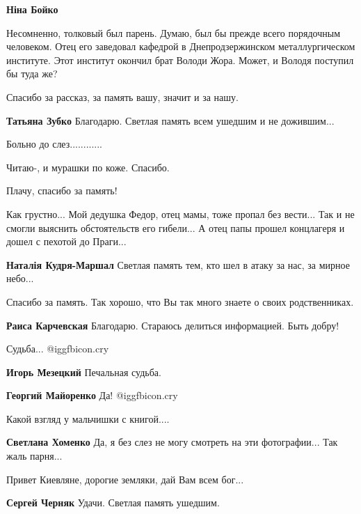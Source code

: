 \begin{itemize}
\begin{itemize}
\textbf{Ніна Бойко} 

Несомненно, толковый был парень. Думаю, был бы прежде всего порядочным
человеком. Отец его заведовал кафедрой в Днепродзержинском металлургическом
институте. Этот институт окончил брат Володи Жора. Может, и Володя поступил бы
туда же?

\end{itemize} %

Спасибо за рассказ, за память вашу, значит и за нашу.

\textbf{Татьяна Зубко} Благодарю. Светлая память всем ушедшим и не дожившим...

Больно до слез............

Читаю-, и мурашки по коже. Спасибо.

Плачу, спасибо за память!


Как грустно... Мой дедушка Федор, отец мамы, тоже пропал без вести... Так и не
смогли выяснить обстоятельств его гибели... А отец папы прошел концлагеря и
дошел с пехотой до Праги...

\textbf{Наталія Кудря-Маршал} Светлая память тем, кто шел в атаку за нас, за мирное небо...

Спасибо за память. Так хорошо, что Вы так много знаете о своих родственниках.

\textbf{Раиса Карчевская} Благодарю. Стараюсь делиться информацией. Быть добру!

Судьба... @igg{fbicon.cry} 

\begin{itemize} %
\textbf{Игорь Мезецкий} Печальная судьба.

\textbf{Георгий Майоренко} Да! @igg{fbicon.cry} 
\end{itemize} %

Какой взгляд у мальчишки с книгой....

\textbf{Светлана Хоменко} Да, я без слез не могу смотреть на эти фотографии... Так жаль парня...

Привет Киевляне, дорогие земляки, дай Вам всем бог...

\textbf{Сергей Черняк} Удачи. Светлая память ушедшим.


\end{itemize}
